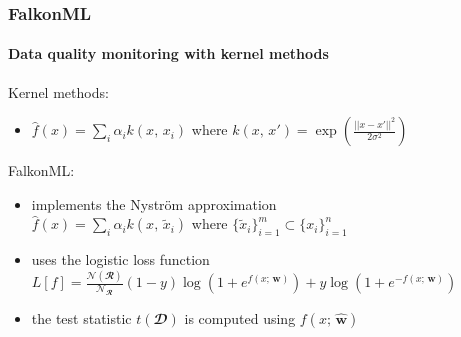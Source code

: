 \documentclass{beamer}
\begin{document}
	\begin{frame}
		\frametitle{FalkonML}
		\framesubtitle{Data quality monitoring with kernel methods}

		Kernel methods:
		\begin{itemize}
			\item $\widehat{f}(x)=\sum_{i}\alpha_i k(x,\,x_i)$ where $k(x,\,x')=\exp(\frac{||x-x'||^2}{2\sigma^2})$
		\end{itemize}

		\vfill

		FalkonML:
		\begin{itemize}
			\setlength{\itemsep}{0.7em}
			\item implements the \alert{Nystr\"{o}m approximation} \\\vspace{0.2em}
			$\widehat{f}(x)=\sum_{i}\alpha_i k(x,\,\widetilde{x}_i)$ where $\{\widetilde{x}_i\}_{i=1}^{m} \subset
			\{x_i\}_{i=1}^{n}$
			\item uses the \alert{logistic loss function} \\\vspace{0.2em}
			$L[f] = \frac{
				\mathcal{N}(\mathbfcal{R})
			}{
				\mathcal{N}_{\mathbfcal{R}}
			}
			(1-y)
			\log(1+e^{f(x;\,\bm{{w}})})
			+ y\log(1+e^{-f(x;\,\bm{{w}})})
			$
			\item the test statistic $t(\mathbfcal{D})$ is computed using $f(x;\,\bm{\widehat{w}})$
			
		\end{itemize}

		\vfill

		

		
	\end{frame}
\end{document}
